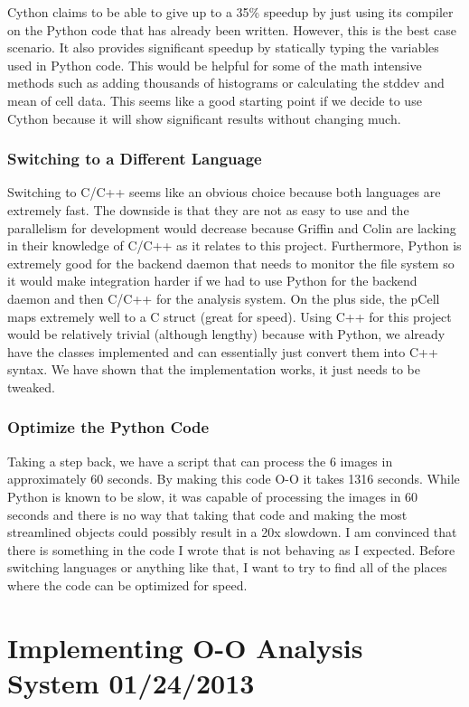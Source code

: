 \documentclass[]{article}
\begin{document}
				Cython claims to be able to give up to a 35\% speedup by just using its compiler on the Python code that has already been written. However, this is the best case scenario. It also provides significant speedup by statically typing the variables used in Python code. This would be helpful for some of the math intensive methods such as adding thousands of histograms or calculating the stddev and mean of cell data. This seems like a good starting point if we decide to use Cython because it will show significant results without changing much.
				
			\subsubsection{Switching to a Different Language}
				Switching to C/C++ seems like an obvious choice because both languages are extremely fast. The downside is that they are not as easy to use and the parallelism for development would decrease because Griffin and Colin are lacking in their knowledge of C/C++ as it relates to this project. Furthermore, Python is extremely good for the backend daemon that needs to monitor the file system so it would make integration harder if we had to use Python for the backend daemon and then C/C++ for the analysis system. On the plus side, the pCell maps extremely well to a C struct (great for speed). Using C++ for this project would be relatively trivial (although lengthy) because with Python, we already have the classes implemented and can essentially just convert them into C++ syntax. We have shown that the implementation works, it just needs to be tweaked. 
			
			\subsubsection{Optimize the Python Code}
				Taking a step back, we have a script that can process the 6 images in approximately 60 seconds. By making this code O-O it takes 1316 seconds. While Python is known to be slow, it was capable of processing the images in 60 seconds and there is no way that taking that code and making the most streamlined objects could possibly result in a 20x slowdown. I am convinced that there is something in the code I wrote that is not behaving as I expected. Before switching languages or anything like that, I want to try to find all of the places where the code can be optimized for speed. 
	
	\section{Implementing O-O Analysis System 01/24/2013}
	
\end{document}
